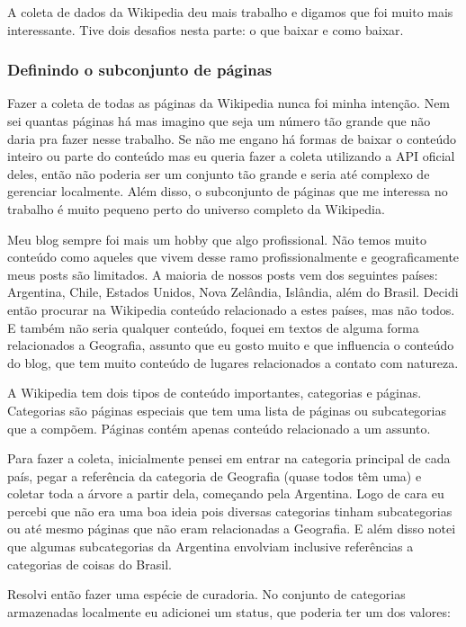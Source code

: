 A coleta de dados da Wikipedia deu mais trabalho e digamos que foi muito mais interessante. Tive dois desafios nesta parte: o que baixar e como baixar.

\subsubsection{Definindo o subconjunto de páginas}

Fazer a coleta de todas as páginas da Wikipedia nunca foi minha intenção. Nem sei quantas páginas há mas imagino que seja um número tão grande que 
não daria pra fazer nesse trabalho. Se não me engano há formas de baixar o conteúdo inteiro ou parte do conteúdo mas eu queria fazer a coleta 
utilizando a API oficial deles, então não poderia ser um conjunto tão grande e seria até complexo de gerenciar localmente. Além disso, o subconjunto 
de páginas que me interessa no trabalho é muito pequeno perto do universo completo da Wikipedia.

Meu blog sempre foi mais um hobby que algo profissional. Não temos muito conteúdo como aqueles que vivem desse ramo profissionalmente e geograficamente 
meus posts são limitados. A maioria de nossos posts vem dos seguintes países: Argentina, Chile, Estados Unidos, Nova Zelândia, Islândia, além do Brasil. 
Decidi então procurar na Wikipedia conteúdo relacionado a estes países, mas não todos. E também não seria qualquer conteúdo, foquei em textos 
de alguma forma relacionados a Geografia, assunto que eu gosto muito e que influencia o conteúdo do blog, que tem muito conteúdo de lugares 
relacionados a contato com natureza.

A Wikipedia tem dois tipos de conteúdo importantes, categorias e páginas. Categorias são páginas especiais que tem uma lista de páginas ou 
subcategorias que a compõem. Páginas contém apenas conteúdo relacionado a um assunto.

Para fazer a coleta, inicialmente pensei em entrar na categoria principal de cada país, pegar a referência da categoria de Geografia 
(quase todos têm uma) e coletar toda a árvore a partir dela, começando pela Argentina. Logo de cara eu percebi que não era uma boa ideia 
pois diversas categorias tinham subcategorias ou até mesmo páginas que não eram relacionadas a Geografia. E além disso notei que algumas 
subcategorias da Argentina envolviam inclusive referências a categorias de coisas do Brasil. 

Resolvi então fazer uma espécie de curadoria. No conjunto de categorias armazenadas localmente eu adicionei um status, que poderia ter um dos valores:


